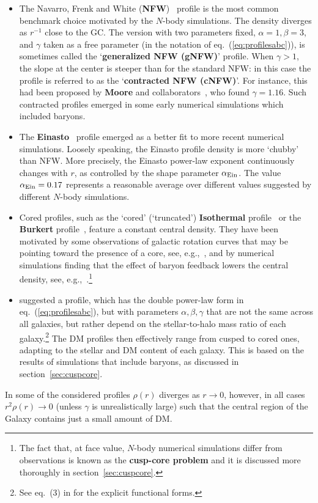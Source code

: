 \begin{itemize}
\item[$\triangleright$] 
The Navarro, Frenk and White ({\bf NFW})~\cite{NFW} profile is the most common benchmark choice motivated by the $N$-body simulations.
The density diverges as $r^{-1}$ close to the GC. The version with two parameters fixed, $\alpha =1, \beta =3$, and $\gamma$ taken as a free parameter (in the notation of eq.~(\ref{eq:profilesabc})), is sometimes called the `{\bf generalized NFW (gNFW)}' profile. 
When $\gamma >1$, the slope at the center is steeper than for the standard NFW: in this case the profile is referred to as the `{\bf contracted NFW (cNFW)}'. 
For instance, this had been proposed by {\bf Moore} and collaborators~\cite{Moore04}, who found $\gamma =1.16$. 
Such contracted profiles emerged in some early numerical simulations which included baryons.
\item[$\triangleright$] 
The {\bf Einasto}~\cite{Einasto} profile emerged as a better fit to more recent numerical simulations.
Loosely speaking, the Einasto profile density is more `chubby' than NFW.
More precisely, the Einasto  power-law exponent continuously changes with $r$, as controlled by the shape parameter $\alpha_{\rm Ein}$.
The value $\alpha_{\rm Ein}=0.17$ represents a reasonable average over different values suggested by different $N$-body simulations.


\item[$\triangleright$] 
Cored profiles, such as the `cored' (`truncated') {\bf Isothermal} profile~\cite{IsoT} or the {\bf Burkert} profile~\cite{Burkert}, feature a constant central density. They have been motivated by some observations of galactic rotation curves that may be pointing toward the presence of a core, see, e.g.,~\cite{cored}, and by numerical simulations finding that the effect of baryon feedback lowers the central density, see, e.g.,~\cite{Mollitor:2014ara}.\footnote{The fact that, at face value, $N$-body numerical simulations differ from observations is known as the {\bf cusp-core problem} and it is discussed more thoroughly in section~\ref{sec:cuspcore}.}

\item[$\triangleright$]  
 \cite{DiCintio:2014xia} suggested a profile, which has the double power-law form in eq.~(\ref{eq:profilesabc}), but with parameters $\alpha, \beta, \gamma$ that are not the same across all galaxies, but rather depend on the stellar-to-halo mass ratio of each galaxy.\footnote{See eq.~(3) in  \cite{DiCintio:2014xia} for the explicit functional forms.} The DM profiles then effectively range from cusped to cored ones, adapting to the stellar and DM content of each galaxy. This is based on the results of simulations that include baryons, as discussed in section~\ref{sec:cuspcore}.
\end{itemize}
In some of the considered profiles $\rho(r)$ diverges as $r\to 0$, however, in all cases $r^2\rho(r)\to 0$ (unless $\gamma$ is unrealistically large) such that the central region of the Galaxy contains just a small amount of DM. 


